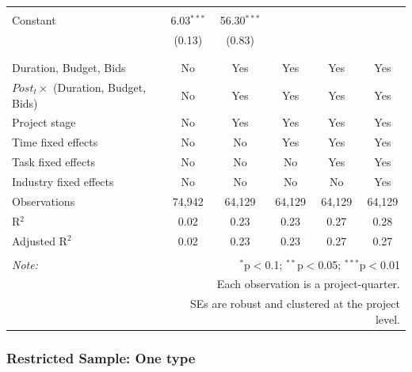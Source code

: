 \documentclass[
]{article}
\begin{document}
\begin{table}[H]
\begin{tabular}{@{\extracolsep{-2pt}}lccccc}
  & & & & & \\ 
 Constant & 6.03$^{***}$ & 56.30$^{***}$ &  &  &  \\ 
  & (0.13) & (0.83) &  &  &  \\ 
  & & & & & \\ 
\hline \\[-1.8ex] 
Duration, Budget, Bids & No & Yes & Yes & Yes & Yes \\ 
$Post_t \times $  (Duration, Budget, Bids) & No & Yes & Yes & Yes & Yes \\ 
Project stage & No & Yes & Yes & Yes & Yes \\ 
Time fixed effects & No & No & Yes & Yes & Yes \\ 
Task fixed effects & No & No & No & Yes & Yes \\ 
Industry fixed effects & No & No & No & No & Yes \\ 
Observations & 74,942 & 64,129 & 64,129 & 64,129 & 64,129 \\ 
R$^{2}$ & 0.02 & 0.23 & 0.23 & 0.27 & 0.28 \\ 
Adjusted R$^{2}$ & 0.02 & 0.23 & 0.23 & 0.27 & 0.27 \\ 
\hline 
\hline \\[-1.8ex] 
\textit{Note:}  & \multicolumn{5}{r}{$^{*}$p$<$0.1; $^{**}$p$<$0.05; $^{***}$p$<$0.01} \\ 
 & \multicolumn{5}{r}{Each observation is a project-quarter.} \\ 
 & \multicolumn{5}{r}{SEs are robust and clustered at the project level.} \\ 
\end{tabular} 
\end{table}

\hypertarget{restricted-sample-one-type-1}{%
\subsubsection{Restricted Sample: One
type}\label{restricted-sample-one-type-1}}
\end{document}
